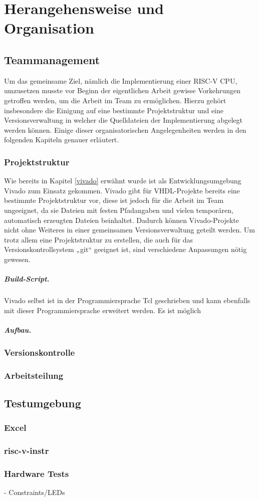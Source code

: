 \chapter{Herangehensweise und Organisation} 
\label{Herangehensweise} 

\section{Teammanagement}
Um das gemeinsame Ziel, nämlich die Implementierung einer RISC-V CPU,
umzusetzen musste vor Beginn der eigentlichen Arbeit gewisse
Vorkehrungen getroffen werden, um die Arbeit im Team zu ermöglichen.
Hierzu gehört insbesondere die Einigung auf eine bestimmte
Projektstruktur und eine Versionsverwaltung in welcher die Quelldateien
der Implementierung abgelegt werden können. Einige dieser
organisatorischen Angelegenheiten werden in den folgenden Kapiteln 
genauer erläutert. 

\subsection{Projektstruktur}
Wie bereits in Kapitel \ref{vivado} erwähnt wurde ist als
Entwicklungsumgebung Vivado zum Einsatz gekommen. Vivado gibt für
VHDL-Projekte bereits eine bestimmte Projektstruktur vor, diese ist
jedoch für die Arbeit im Team ungeeignet, da sie Dateien mit festen 
Pfadangaben  und vielen temporären, automatisch erzeugten Dateien
beinhaltet. Dadurch können Vivado-Projekte nicht ohne Weiteres in einer
gemeinsamen Versionsverwaltung geteilt werden. Um trotz allem eine
Projektstruktur zu erstellen, die auch für das Versionskontrollsystem
„git“ geeignet ist, sind verschiedene Anpassungen nötig gewesen.

\paragraph{Build-Script.}  
Vivado selbst ist in der Programmiersprache Tcl geschrieben und kann
ebenfalls mit dieser Programmiersprache erweitert werden. Es ist möglich  
\paragraph{Aufbau.}  

\subsection{Versionskontrolle}
\subsection{Arbeitsteilung}

\section{Testumgebung}
\subsection{Excel}
\subsection{risc-v-instr}
\subsection{Hardware Tests}
- Constraints/LEDs
